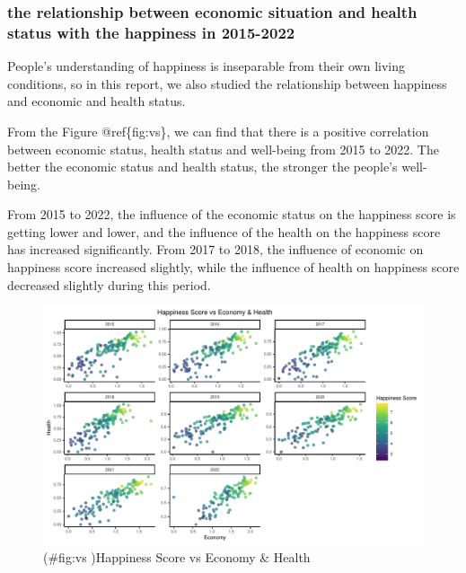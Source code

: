 \documentclass[11pt,a4paper,]{article}
\begin{document}
\hypertarget{the-relationship-between-economic-situation-and-health-status-with-the-happiness-in-2015-2022}{%
\subsubsection{the relationship between economic situation and health status with the happiness in 2015-2022}\label{the-relationship-between-economic-situation-and-health-status-with-the-happiness-in-2015-2022}}

People's understanding of happiness is inseparable from their own living conditions, so in this report, we also studied the relationship between happiness and economic and health status.

From the Figure @ref\{fig:vs\}, we can find that there is a positive correlation between economic status, health status and well-being from 2015 to 2022. The better the economic status and health status, the stronger the people's well-being.

From 2015 to 2022, the influence of the economic status on the happiness score is getting lower and lower, and the influence of the health on the happiness score has increased significantly. From 2017 to 2018, the influence of economic on happiness score increased slightly, while the influence of health on happiness score decreased slightly during this period.

\begin{figure}
\centering
\includegraphics{Assignment4_files/figure-latex/vs -1.pdf}
\caption{(\#fig:vs )Happiness Score vs Economy \& Health}
\end{figure}
\end{document}
